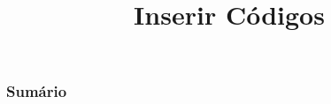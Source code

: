 \documentclass[brazilian]{beamer}
\title{Inserir Códigos}
\begin{document}
\frame{\titlepage}

\begin{frame}
    \frametitle{Sumário}
    \tableofcontents
\end{frame}
\end{document}
